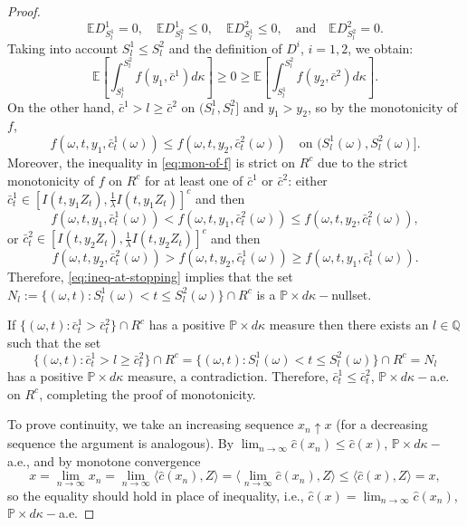 \documentclass[11pt, oneside]{article}   	%
\theoremstyle{plain}
\theoremstyle{definition}
\theoremstyle{remark}
\begin{document}
\begin{proof}
\begin{equation*}
\mathbb{E} D^1_{S_l^1}=0,\quad \mathbb{E} D^1_{S_l^2}\leq 0,\quad \mathbb{E}D^2_{S_l^1}\leq 0,\quad\text{and}\quad \mathbb{E} D^2_{S_l^2}=0.
\end{equation*}
Taking into account $S^1_l\leq S^2_l$ and the definition of $D^i$, $i=1,2$, we obtain:
\begin{equation}\label{eq:ineq-at-stopping}
\mathbb{E}\left[\int_{S^1_l}^{S^2_l}f\left(y_1,\bar{c}^1\right) d\kappa\right]\geq 0\geq \mathbb{E}\left[\int_{S^1_l}^{S^2_l}f\left(y_2,\bar{c}^2\right) d\kappa\right].
\end{equation}
On the other hand, $\bar{c}^1>l\geq \bar{c}^2$ on $(S^1_l,S^2_l]$ and $y_1>y_2$, so by the monotonicity of $f$,
\begin{equation}\label{eq:mon-of-f}
f\left(\omega,t,y_1,\bar{c}^1_t(\omega)\right)\leq f\left(\omega,t,y_2,\bar{c}^2_t(\omega)\right)\quad \text{on }(S^1_l(\omega),S^2_l(\omega)].
\end{equation}
Moreover, the inequality in \eqref{eq:mon-of-f} is strict on $R^c$ due to the strict monotonicity of $f$ on $R^c$ for at least one of $\bar{c}^1$ or $\bar{c}^2$: either $\bar{c}_t^1\in \left[I(t,y_1Z_t),\frac{1}{\lambda}I(t,y_1Z_t)\right]^c$ and then $$f\left(\omega,t,y_1,\bar{c}^1_t(\omega)\right)<f\left(\omega,t,y_1,\bar{c}^2_t(\omega)\right)\leq f\left(\omega,t,y_2,\bar{c}^2_t(\omega)\right),$$ or $\bar{c}^2_t\in \left[I(t,y_2Z_t),\frac{1}{\lambda}I(t,y_2Z_t)\right]^c$ and then $$f\left(\omega,t,y_2,\bar{c}^2_t(\omega)\right)> f\left(\omega,t,y_2,\bar{c}^1_t(\omega)\right)\geq f\left(\omega,t,y_1,\bar{c}^1_t(\omega)\right).$$
Therefore, \eqref{eq:ineq-at-stopping} implies that the set
 $N_l:=\{(\omega,t): S^1_l(\omega)<t\leq S^2_l(\omega)\}\cap R^c$
is a $\mathbb{P}\times d\kappa-$nullset.

If $\{(\omega,t):\bar{c}_t^1>\bar{c}_t^2\}\cap R^c$ has a positive $\mathbb{P}\times d\kappa$ measure then there exists an $l\in\mathbb{Q}$ such that the set
$$\{(\omega,t):\bar{c}_t^1> l\geq \bar{c}_t^2\}\cap R^c=\{(\omega,t):S^1_l(\omega)<t\leq S^2_l(\omega)\}\cap R^c= N_l$$
has a positive $\mathbb{P}\times d\kappa$ measure, a contradiction. Therefore, $\bar{c}_t^1\leq\bar{c}_t^2$, $\mathbb{P}\times d\kappa-$a.e. on $R^c$, completing the proof of monotonicity.

To prove continuity, we take an increasing sequence $x_n\uparrow x$ (for a decreasing sequence the argument is analogous). By $\lim_{n\to\infty}\hat{c}(x_n)\leq \hat{c}(x)$, $\mathbb{P}\times d\kappa-$a.e., and by monotone convergence
$$x=\lim_{n\to\infty} x_n=\lim_{n\to\infty}\langle\hat{c}(x_n),Z\rangle = \langle\lim_{n\to\infty}\hat{c}(x_n),Z\rangle\leq \langle\hat{c}(x),Z\rangle=x,$$
so the equality should hold in place of inequality, i.e., $\hat{c}(x)=\lim_{n\to\infty}\hat{c}(x_n)$, $\mathbb{P}\times d\kappa-$a.e.
\end{proof}
\end{document}
